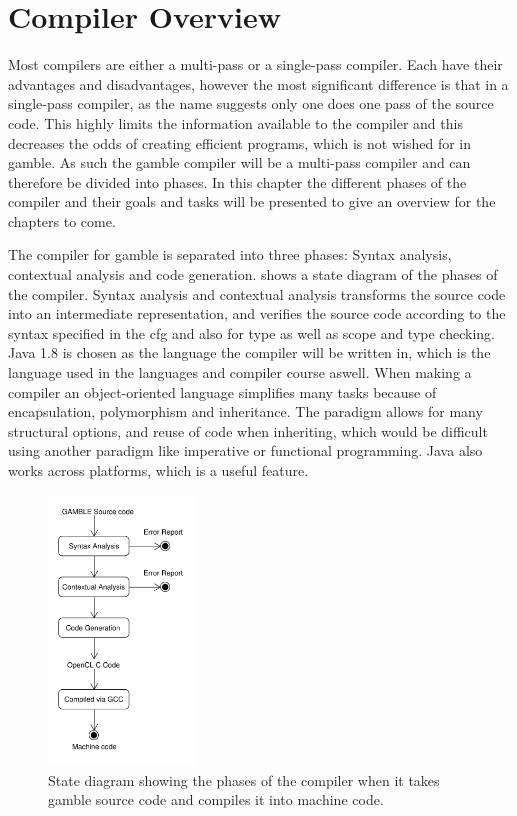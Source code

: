 \chapter{Compiler Overview}\label{Chp:CompilerOverview}
Most compilers are either a multi-pass or a single-pass compiler. 
Each have their advantages and disadvantages, however the most significant difference is that in a single-pass compiler, as the name suggests only one does one pass of the source code. 
This highly limits the information available to the compiler and this decreases the odds of creating efficient programs, which is not wished for in \gls{gamble}. 
As such the \gls{gamble} compiler will be a multi-pass compiler and can therefore be divided into phases.
In this chapter the different phases of the compiler and their goals and tasks will be presented to give an overview for the chapters to come.

The compiler for \gls{gamble} is separated into three phases: Syntax analysis, contextual analysis and code generation.
 shows a state diagram of the phases of the compiler.
Syntax analysis and contextual analysis transforms the source code into an intermediate representation, and verifies the source code according to the syntax specified in the \acrshort{cfg} and also for type as well as scope and type checking.
Java 1.8 is chosen as the language the compiler will be written in, which is the language used in the languages and compiler course aswell.
When making a compiler an object-oriented language simplifies many tasks because of encapsulation, polymorphism and inheritance. 
The paradigm allows for many structural options, and reuse of code when inheriting, which would be difficult using another paradigm like imperative or functional programming.
Java also works across platforms, which is a useful feature.

\begin{figure}[ht]
\centering
\includegraphics[width=0.35\textwidth]{figures/ClassDiagrams/CompilerDiagram.pdf}
\caption{State diagram showing the phases of the compiler when it takes \gls{gamble} source code and compiles it into machine code.}\label{fig:phases}
\end{figure}

